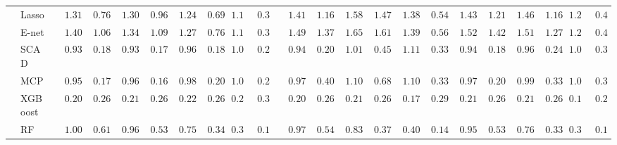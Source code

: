 \documentclass{article}
\begin{document}
\begin{tabular}{ll|ll|llllll|llllll|llllll}
 & Lasso  & $\phantom{00}1.31$ & $\phantom{00}0.76$ & $\phantom{00}1.30$ & $\phantom{00}0.96$ & $\phantom{00}1.24$ & $\phantom{00}0.69$ & $\phantom{0}1.19$ & $\phantom{0}0.33$ & $\phantom{00}1.41$ & $\phantom{00}1.16$ & $\phantom{00}1.58$ & $\phantom{00}1.47$ & $\phantom{00}1.38$ & $\phantom{00}0.54$ & $\phantom{00}1.43$ & $\phantom{00}1.21$ & $\phantom{00}1.46$ & $\phantom{00}1.16$ & $\phantom{0}1.22$ & $\phantom{0}0.40$ \\
 & E-net  & $\phantom{00}1.40$ & $\phantom{00}1.06$ & $\phantom{00}1.34$ & $\phantom{00}1.09$ & $\phantom{00}1.27$ & $\phantom{00}0.76$ & $\phantom{0}1.19$ & $\phantom{0}0.31$ & $\phantom{00}1.49$ & $\phantom{00}1.37$ & $\phantom{00}1.65$ & $\phantom{00}1.61$ & $\phantom{00}1.39$ & $\phantom{00}0.56$ & $\phantom{00}1.52$ & $\phantom{00}1.42$ & $\phantom{00}1.51$ & $\phantom{00}1.27$ & $\phantom{0}1.23$ & $\phantom{0}0.41$ \\
 & SCAD  & $\phantom{00}0.93$ & $\phantom{00}0.18$ & $\phantom{00}0.93$ & $\phantom{00}0.17$ & $\phantom{00}0.96$ & $\phantom{00}0.18$ & $\phantom{0}1.08$ & $\phantom{0}0.29$ & $\phantom{00}0.94$ & $\phantom{00}0.20$ & $\phantom{00}1.01$ & $\phantom{00}0.45$ & $\phantom{00}1.11$ & $\phantom{00}0.33$ & $\phantom{00}0.94$ & $\phantom{00}0.18$ & $\phantom{00}0.96$ & $\phantom{00}0.24$ & $\phantom{0}1.08$ & $\phantom{0}0.30$ \\
 & MCP  & $\phantom{00}0.95$ & $\phantom{00}0.17$ & $\phantom{00}0.96$ & $\phantom{00}0.16$ & $\phantom{00}0.98$ & $\phantom{00}0.20$ & $\phantom{0}1.06$ & $\phantom{0}0.27$ & $\phantom{00}0.97$ & $\phantom{00}0.40$ & $\phantom{00}1.10$ & $\phantom{00}0.68$ & $\phantom{00}1.10$ & $\phantom{00}0.33$ & $\phantom{00}0.97$ & $\phantom{00}0.20$ & $\phantom{00}0.99$ & $\phantom{00}0.33$ & $\phantom{0}1.07$ & $\phantom{0}0.31$ \\
 & XGBoost  & $\phantom{00}0.20$ & $\phantom{00}0.26$ & $\phantom{00}0.21$ & $\phantom{00}0.26$ & $\phantom{00}0.22$ & $\phantom{00}0.26$ & $\phantom{0}0.23$ & $\phantom{0}0.30$ & $\phantom{00}0.20$ & $\phantom{00}0.26$ & $\phantom{00}0.21$ & $\phantom{00}0.26$ & $\phantom{00}0.17$ & $\phantom{00}0.29$ & $\phantom{00}0.21$ & $\phantom{00}0.26$ & $\phantom{00}0.21$ & $\phantom{00}0.26$ & $\phantom{0}0.18$ & $\phantom{0}0.29$ \\
 & RF  & $\phantom{00}1.00$ & $\phantom{00}0.61$ & $\phantom{00}0.96$ & $\phantom{00}0.53$ & $\phantom{00}0.75$ & $\phantom{00}0.34$ & $\phantom{0}0.36$ & $\phantom{0}0.11$ & $\phantom{00}0.97$ & $\phantom{00}0.54$ & $\phantom{00}0.83$ & $\phantom{00}0.37$ & $\phantom{00}0.40$ & $\phantom{00}0.14$ & $\phantom{00}0.95$ & $\phantom{00}0.53$ & $\phantom{00}0.76$ & $\phantom{00}0.33$ & $\phantom{0}0.38$ & $\phantom{0}0.12$ \\

\end{tabular}
\end{document}
